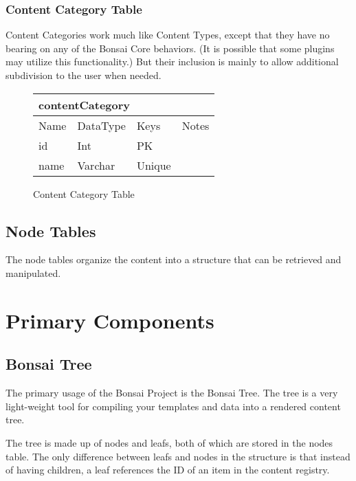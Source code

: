 \documentclass[]{book}
\begin{document}
\subsection{Content Category Table}

Content Categories work much like Content Types, except that they have no bearing on any of the Bonsai Core behaviors. (It is possible that some plugins may utilize this functionality.) But their inclusion is mainly to allow additional subdivision to the user when needed.

\begin{figure}[H]
	\centering
	\caption{Content Category Table}
	\vspace{12pt}
	\begin{tabular}{ |p{1.25in}|p{.75in}|p{2in}|p{1in}| }
		\hline
		\multicolumn{4}{|l|}{\textbf{contentCategory}} \\
		\hline
		\hline
		Name & DataType & Keys & Notes\\
		\hline
		id & Int & PK & \\
		name & Varchar & Unique & \\
		\hline
	\end{tabular}
\end{figure}

\section{Node Tables}

The node tables organize the content into a structure that can be retrieved and manipulated.



\chapter{Primary Components}

\section{Bonsai Tree}
\label{sec:bonsaiTree}

The primary usage of the Bonsai Project is the Bonsai Tree. The tree is a very light-weight tool for compiling your templates and data into a rendered content tree.

The tree is made up of nodes and leafs, both of which are stored in the nodes table. The only difference between leafs and nodes in the structure is that instead of having children, a leaf references the ID of an item in the content registry.
\end{document}

